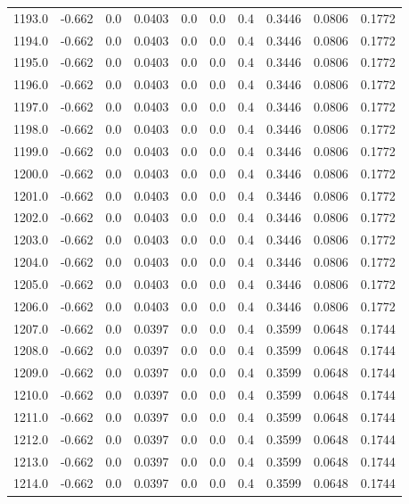 \begin{longtable}{lrrrrrrrrr}
1193.0 & -0.662 & 0.0 & 0.0403 & 0.0 & 0.0 & 0.4 & 0.3446 & 0.0806 & 0.1772 \\
1194.0 & -0.662 & 0.0 & 0.0403 & 0.0 & 0.0 & 0.4 & 0.3446 & 0.0806 & 0.1772 \\
1195.0 & -0.662 & 0.0 & 0.0403 & 0.0 & 0.0 & 0.4 & 0.3446 & 0.0806 & 0.1772 \\
1196.0 & -0.662 & 0.0 & 0.0403 & 0.0 & 0.0 & 0.4 & 0.3446 & 0.0806 & 0.1772 \\
1197.0 & -0.662 & 0.0 & 0.0403 & 0.0 & 0.0 & 0.4 & 0.3446 & 0.0806 & 0.1772 \\
1198.0 & -0.662 & 0.0 & 0.0403 & 0.0 & 0.0 & 0.4 & 0.3446 & 0.0806 & 0.1772 \\
1199.0 & -0.662 & 0.0 & 0.0403 & 0.0 & 0.0 & 0.4 & 0.3446 & 0.0806 & 0.1772 \\
1200.0 & -0.662 & 0.0 & 0.0403 & 0.0 & 0.0 & 0.4 & 0.3446 & 0.0806 & 0.1772 \\
1201.0 & -0.662 & 0.0 & 0.0403 & 0.0 & 0.0 & 0.4 & 0.3446 & 0.0806 & 0.1772 \\
1202.0 & -0.662 & 0.0 & 0.0403 & 0.0 & 0.0 & 0.4 & 0.3446 & 0.0806 & 0.1772 \\
1203.0 & -0.662 & 0.0 & 0.0403 & 0.0 & 0.0 & 0.4 & 0.3446 & 0.0806 & 0.1772 \\
1204.0 & -0.662 & 0.0 & 0.0403 & 0.0 & 0.0 & 0.4 & 0.3446 & 0.0806 & 0.1772 \\
1205.0 & -0.662 & 0.0 & 0.0403 & 0.0 & 0.0 & 0.4 & 0.3446 & 0.0806 & 0.1772 \\
1206.0 & -0.662 & 0.0 & 0.0403 & 0.0 & 0.0 & 0.4 & 0.3446 & 0.0806 & 0.1772 \\
1207.0 & -0.662 & 0.0 & 0.0397 & 0.0 & 0.0 & 0.4 & 0.3599 & 0.0648 & 0.1744 \\
1208.0 & -0.662 & 0.0 & 0.0397 & 0.0 & 0.0 & 0.4 & 0.3599 & 0.0648 & 0.1744 \\
1209.0 & -0.662 & 0.0 & 0.0397 & 0.0 & 0.0 & 0.4 & 0.3599 & 0.0648 & 0.1744 \\
1210.0 & -0.662 & 0.0 & 0.0397 & 0.0 & 0.0 & 0.4 & 0.3599 & 0.0648 & 0.1744 \\
1211.0 & -0.662 & 0.0 & 0.0397 & 0.0 & 0.0 & 0.4 & 0.3599 & 0.0648 & 0.1744 \\
1212.0 & -0.662 & 0.0 & 0.0397 & 0.0 & 0.0 & 0.4 & 0.3599 & 0.0648 & 0.1744 \\
1213.0 & -0.662 & 0.0 & 0.0397 & 0.0 & 0.0 & 0.4 & 0.3599 & 0.0648 & 0.1744 \\
1214.0 & -0.662 & 0.0 & 0.0397 & 0.0 & 0.0 & 0.4 & 0.3599 & 0.0648 & 0.1744 \\

\end{longtable}
